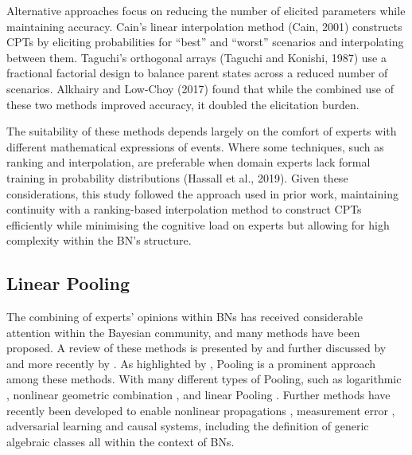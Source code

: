 \documentclass{article}
\begin{document}
Alternative approaches focus on reducing the number of elicited parameters while maintaining accuracy. Cain’s linear interpolation method (Cain, 2001) constructs CPTs by eliciting probabilities for “best” and “worst” scenarios and interpolating between them. Taguchi’s orthogonal arrays (Taguchi and Konishi, 1987) use a fractional factorial design to balance parent states across a reduced number of scenarios. Alkhairy and Low-Choy (2017) found that while the combined use of these two methods improved accuracy, it doubled the elicitation burden.

The suitability of these methods depends largely on the comfort of experts with different mathematical expressions of events. Where some techniques, such as ranking and interpolation, are preferable when domain experts lack formal training in probability distributions (Hassall et al., 2019). Given these considerations, this study followed the approach used in prior work, maintaining continuity with a ranking-based interpolation method to construct CPTs efficiently while minimising the cognitive load on experts but allowing for high complexity within the BN's structure.

\subsection{Linear Pooling}

The combining of experts’ opinions within BNs has received considerable attention within the Bayesian community, and many methods have been proposed. A review of these methods is presented by \cite{genest1986combining} and further discussed by \cite{ohagan2006uncertain} and more recently by \cite{albert2012combining}. As highlighted by \cite{ohagan2006uncertain}, Pooling is a prominent approach among these methods. With many different types of Pooling, such as logarithmic \cite{genest1984aggregating}, nonlinear geometric combination \cite{faria2008geometric}, and linear Pooling \cite{mcconway1981marginalization}. Further methods have recently been developed to enable nonlinear propagations \cite{volodina2024propagatingmomentsprobabilisticgraphical}, measurement error \cite{farr2020combining}, adversarial learning \cite{rios2023adversarial} and causal systems, including the definition of generic algebraic classes \cite{ramiah2024bayesian} all within the context of BNs.
\end{document}
